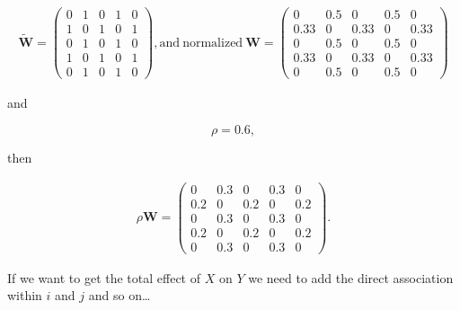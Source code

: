\documentclass[
  letterpaper,
  DIV=11,
  numbers=noendperiod]{scrreprt}
\begin{document}
\[
\begin{split}
\tilde{\boldsymbol{\mathbf{W}}} = \begin{pmatrix}
      0 & 1 & 0 & 1 & 0 \\
      1 & 0 & 1 & 0 & 1 \\
      0 & 1 & 0 & 1 & 0 \\
      1 & 0 & 1 & 0 & 1 \\
      0 & 1 & 0 & 1 & 0
      \end{pmatrix}, \mathrm{and~normalized} ~
\boldsymbol{\mathbf{W}} = \begin{pmatrix}
      0 & 0.5 & 0 & 0.5 & 0 \\
      0.33 & 0 & 0.33 & 0 & 0.33 \\
      0 & 0.5 & 0 & 0.5 & 0 \\
      0.33 & 0 & 0.33 & 0 & 0.33 \\
      0 & 0.5 & 0 & 0.5 & 0
      \end{pmatrix}      
\end{split}
\]

and

\[
\rho = 0.6,
\]

then

\[
\begin{split}
\rho \boldsymbol{\mathbf{W}} = \begin{pmatrix}
      0 & 0.3 & 0 & 0.3 & 0 \\
      0.2 & 0 & 0.2 & 0 & 0.2 \\
      0 & 0.3 & 0 & 0.3 & 0 \\
      0.2 & 0 & 0.2 & 0 & 0.2 \\
      0 & 0.3 & 0 & 0.3 & 0
      \end{pmatrix}.
\end{split}
\]

If we want to get the total effect of \(X\) on \(Y\) we need to add the
direct association within \(i\) and \(j\) and so on\ldots{}
\end{document}
